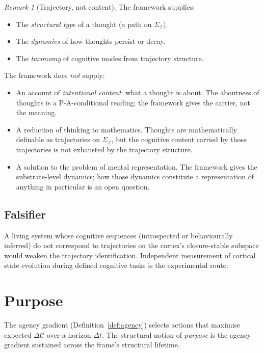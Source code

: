 \documentclass[11pt]{article}
\theoremstyle{plain}
\theoremstyle{definition}
\theoremstyle{remark}
\newtheorem{remark}[theorem]{Remark}
\newcommand{\Ical}{\mathcal{I}}
\newcommand{\Ccal}{\mathcal{C}}
\begin{document}
\begin{remark}[Trajectory, not content]\label{rem:thought-discipline}
The framework supplies:
\begin{itemize}[leftmargin=2em]
\item The \emph{structural type} of a thought (a path on $\Sigma_\Ical$).
\item The \emph{dynamics} of how thoughts persist or decay.
\item The \emph{taxonomy} of cognitive modes from trajectory structure.
\end{itemize}
The framework does \emph{not} supply:
\begin{itemize}[leftmargin=2em]
\item An account of \emph{intentional content}: what a thought is about. The aboutness of thoughts is a P-A-conditional reading; the framework gives the carrier, not the meaning.
\item A reduction of thinking to mathematics. Thoughts are mathematically definable as trajectories on $\Sigma_\Ical$, but the cognitive content carried by those trajectories is not exhausted by the trajectory structure.
\item A solution to the problem of mental representation. The framework gives the substrate-level dynamics; how those dynamics constitute a representation of anything in particular is an open question.
\end{itemize}
\end{remark}

\subsection{Falsifier}

A living system whose cognitive sequences (introspected or behaviourally inferred) do not correspond to trajectories on the cortex's closure-stable subspace would weaken the trajectory identification. Independent measurement of cortical state evolution during defined cognitive tasks is the experimental route.

\section{Purpose}\label{sec:purpose}

The agency gradient (Definition~\ref{def:agency}) selects actions that maximise expected $\Delta \Ccal$ over a horizon $\Delta t$. The structural notion of \emph{purpose} is the agency gradient sustained across the frame's structural lifetime.
\end{document}
